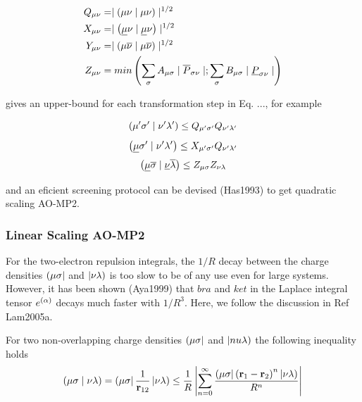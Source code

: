 \begin{equation}
\begin{split}
Q_{\mu\nu} &= \mid \left( \mu\nu \mid \mu\nu \right) \mid ^{1/2} \\
X_{\mu\nu} &= \mid \left( \underline{\mu}\nu \mid \underline{\mu}\nu \right) \mid ^{1/2} \\
Y_{\mu\nu} &= \mid \left( \mu\overline{\nu} \mid \mu\overline{\nu} \right) \mid ^{1/2} \\
Z_{\mu\nu} &= min\left( \sum_{\sigma} A_{\mu\sigma} \mid \overline{P}_{\sigma\nu} \mid; \sum_{\sigma} B_{\mu \sigma} \mid \underline{P}_{\sigma\nu} \mid \right)
\end{split}
\end{equation} 

\noindent gives an upper-bound for each transformation step in Eq. ..., for example 

\begin{equation}
\left( \mu'\sigma' \mid \nu'\lambda' \right) \leq Q_{\mu'\sigma'}Q_{\nu'\lambda'}
\end{equation}
\begin{equation}
\left( \underline{\mu}\sigma' \mid \nu'\lambda' \right) \leq X_{\mu'\sigma'}Q_{\nu'\lambda'}
\end{equation}
\begin{equation}
\left( \underline{\mu} \overline{\sigma} \mid \underline{\nu}\overline{\lambda} \right) \leq Z_{\mu\sigma} Z_{\nu\lambda}
\end{equation}

\noindent and an eficient screening protocol can be devised (Has1993) to get quadratic scaling AO-MP2.

\subsubsection{Linear Scaling AO-MP2}

For the two-electron repulsion integrals, the $1/R$ decay between the charge densities $\left( \mu\sigma \right\rvert$ and $\left\lvert \nu\lambda \right)$ is too slow to be of any use even for large systems. However, it has been shown (Aya1999) that $bra$ and $ket$ in the Laplace integral tensor $e^{(\alpha)}$ decays much faster with $1/R^3$. Here, we follow the discussion in Ref Lam2005a. 

For two non-overlapping charge densities $\left( \mu\sigma \right\rvert$ and $\left\lvert nu\lambda \right)$ the following inequality holds
\begin{equation}
\left( \mu\sigma \mid \nu\lambda \right) = \left( \mu\sigma \right\rvert\frac{1}{\mathbf{r}_{12}}\left\lvert \nu\lambda \right) \leq \frac{1}{R} \left\lvert \sum_{n=0}^{\infty} \frac{\left( \mu\sigma \right\rvert \left( \mathbf{r}_1 - \mathbf{r}_2 \right)^n \left\lvert \nu\lambda \right)}{R^n} \right\rvert
\end{equation}

